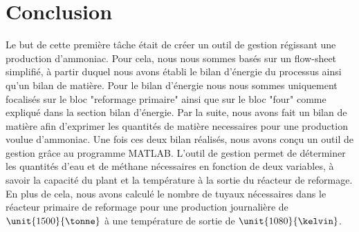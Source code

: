 \section{Conclusion}
Le but de cette première tâche était de créer un outil de gestion régissant une production d'ammoniac. 
Pour cela, nous nous sommes basés sur un flow-sheet simplifié, à partir duquel nous avons établi le bilan d'énergie du processus
ainsi qu'un bilan de matière. Pour le bilan d'énergie nous nous sommes uniquement focalisés sur le bloc "reformage primaire" ainsi
que sur le bloc "four" comme expliqué dans la section bilan d'énergie. Par la suite, nous avons fait un bilan de matière 
afin d'exprimer les quantités de matière necessaires pour une production voulue d'ammoniac. Une fois ces deux bilan 
réalisés, nous avons conçu un outil de gestion grâce au programme \textsc{MATLAB}. L'outil de gestion permet de déterminer les 
quantités d'eau et de méthane nécessaires en fonction de deux variables, à savoir la capacité du plant et la température à 
la sortie du réacteur de reformage. En plus de cela, nous avons calculé le nombre de tuyaux nécessaires dans le réacteur
primaire de reformage pour une production journalière de $\unit{1500}{\tonne}$ à une température de sortie de 
$\unit{1080}{\kelvin}$.
